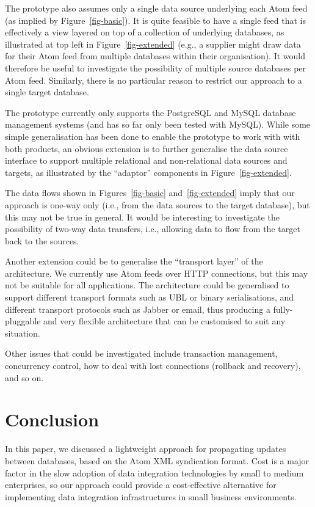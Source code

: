 \documentclass{CRPITStyle}
\begin{document}
The prototype also assumes only a single data source underlying each
Atom feed (as implied by Figure~\ref{fig-basic}). It is quite feasible
to have a single feed that is effectively a view layered on top of a
collection of underlying databases, as illustrated at top left in
Figure~\ref{fig-extended} (e.g., a supplier might draw data for their
Atom feed from multiple databases within their organisation). It would
therefore be useful to investigate the possibility of multiple source
databases per Atom feed. Similarly, there is no particular reason to
restrict our approach to a single target database.

The prototype currently only supports the PostgreSQL and MySQL database
management systems (and has so far only been tested with MySQL). While
some simple generalisation has been done to enable the prototype to work
with with both products, an obvious extension is to further generalise
the data source interface to support multiple relational and
non-relational data sources and targets, as illustrated by the
``adaptor'' components in Figure~\ref{fig-extended}.

The data flows shown in Figures~\ref{fig-basic} and~\ref{fig-extended}
imply that our approach is one-way only (i.e., from the data sources to
the target database), but this may not be true in general. It would be
interesting to investigate the possibility of two-way data transfers,
i.e., allowing data to flow from the target back to the sources.

Another extension could be to generalise the ``transport layer'' of the
architecture. We currently use Atom feeds over HTTP connections, but
this may not be suitable for all applications. The architecture could be
generalised to support different transport formats such as UBL or binary
serialisations, and different transport protocols such as Jabber or
email, thus producing a fully-pluggable and very flexible architecture
that can be customised to suit any situation.

Other issues that could be investigated include transaction management,
concurrency control, how to deal with lost connections (rollback and
recovery), and so on.


\section{Conclusion}
\label{sec-conclusion}

In this paper, we discussed a lightweight approach for propagating
updates between databases, based on the Atom XML syndication format.
Cost is a major factor in the slow adoption of data integration
technologies by small to medium enterprises, so our approach could
provide a cost-effective alternative for implementing data integration
infrastructures in small business environments.
\end{document}
